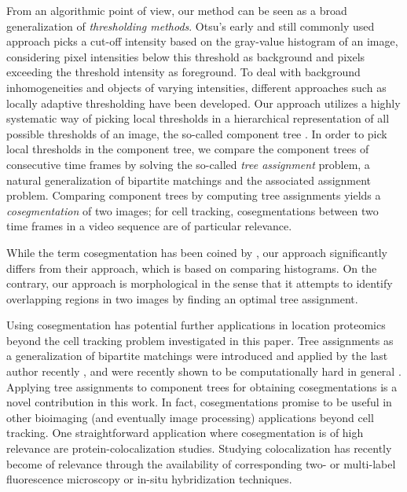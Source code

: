 From an algorithmic point of view, our method can be seen as a broad
generalization of \emph{thresholding methods}. Otsu's early and still
commonly used approach \cite{otsu1975threshold} picks a cut-off intensity based
on the gray-value histogram of an image, considering pixel intensities
below this threshold as background and pixels exceeding the threshold
intensity as foreground. To deal with background inhomogeneities and
objects of varying intensities, different approaches such as locally
adaptive thresholding \cite{Kim:05} have been developed. Our approach
utilizes a highly systematic way of picking local thresholds in a
hierarchical representation of all possible thresholds of an image,
the so-called component tree \cite{jones1999connected,Najman:04}. In order to
pick local thresholds in the component tree, we compare the component
trees of consecutive time frames by solving the so-called \emph{tree
  assignment} problem, a natural generalization of bipartite matchings
and the associated assignment problem. Comparing component trees by
computing tree assignments yields a \emph{cosegmentation} of two
images; for cell tracking, cosegmentations between two time frames in
a video sequence are of particular relevance.

While the term cosegmentation has been coined by \cite{Rother:06},
our approach significantly differs from their approach, which is based
on comparing histograms. On the contrary, our approach is
morphological in the sense that it attempts to identify overlapping
regions in two images by finding an optimal tree assignment.

Using cosegmentation has potential further applications in location
proteomics beyond the cell tracking problem investigated in this
paper. Tree assignments as a generalization of bipartite matchings
were introduced and applied by the last author recently
\cite{mosig2009tracking}, and were recently shown to be computationally hard
in general \cite{Klau:10}. Applying tree assignments to component
trees for obtaining cosegmentations is a novel contribution in this
work. In fact, cosegmentations promise to be useful in other
bioimaging (and eventually image processing) applications beyond cell
tracking. One straightforward application where cosegmentation is of
high relevance are protein-colocalization studies. Studying
colocalization has recently become of relevance through the
availability of corresponding two- or multi-label fluorescence
microscopy \cite{Zinchuk:08,Schubert:06} or in-situ hybridization
\cite{Carson:09,Boettiger:09} techniques.

